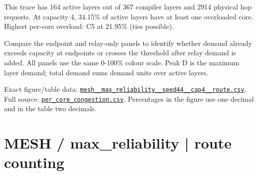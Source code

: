 \documentclass[10pt,a4paper]{article}
\begin{document}
This trace has 164 active layers out of 367 compiler layers and 2914 physical hop requests. At capacity 4, 34.15\% of active layers have at least one overloaded core. Highest per-core overload: C5 at 21.95\% (ties possible).\par
Compare the endpoint and relay-only panels to identify whether demand already exceeds capacity at endpoints or crosses the threshold after relay demand is added. All panels use the same 0-100\% colour scale. Peak D is the maximum layer demand; total demand sums demand units over active layers.\par
Exact figure/table data: \href{\detokenize{file:///home/dhruv-pansuriya/Documents/BTP/Compiler-Driven-ACE/output/pdf/qaoa_methods_congestion/tables/mesh__max_reliability__seed44__cap4__route.csv}}{\nolinkurl{mesh__max_reliability__seed44__cap4__route.csv}}. Full source: \href{\detokenize{file:///home/dhruv-pansuriya/Documents/BTP/Compiler-Driven-ACE/results/qaoa_2seed_2026-10-26/congestion/per_core_congestion.csv}}{\nolinkurl{per_core_congestion.csv}}. Percentages in the figure use one decimal and in the table two decimals.\par
\clearpage
\section*{MESH / max\_reliability | route counting}
\end{document}
